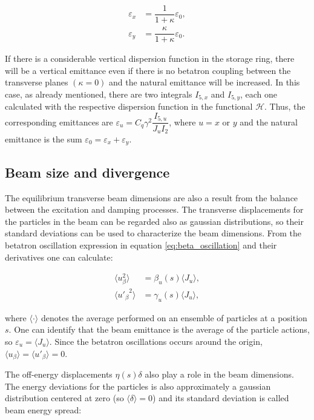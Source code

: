 \begin{align}
    \varepsilon_x &= \dfrac{1}{1 + \kappa}\varepsilon_0, \\
    \varepsilon_y &= \dfrac{\kappa}{1 + \kappa}\varepsilon_0.
\end{align}

If there is a considerable vertical dispersion function in the storage ring, there will be a vertical emittance even if there is no betatron coupling between the transverse planes $(\kappa = 0)$ and the natural emittance will be increased. In this case, as already mentioned, there are two integrals $I_{5, x}$ and $I_{5, y}$, each one calculated with the respective dispersion function in the functional $\mathcal{H}$. Thus, the corresponding emittances are $\varepsilon_u = C_q \gamma^2 \dfrac{I_{5, u}}{J_u I_2}$, where $u=x$ or $y$ and the natural emittance is the sum $\varepsilon_0 = \varepsilon_x + \varepsilon_y$.

\subsection{Beam size and divergence}

The equilibrium transverse beam dimensions are also a result from the balance between the excitation and damping processes. The transverse displacements for the particles in the beam can be regarded also as gaussian distributions, so their standard deviations can be used to characterize the beam dimensions. From the betatron oscillation expression in equation \eqref{eq:beta_oscillation} and their derivatives one can calculate:

\begin{align}
    \langle u_{\beta}^2 \rangle &= \beta_u(s) \langle J_u \rangle,  \\
    \langle {u'_{\beta}}^{2} \rangle &= \gamma_u(s) \langle J_u \rangle,
\end{align}

where $\langle \cdot \rangle$ denotes the average performed on an ensemble of particles at a position $s$. One can identify that the beam emittance is the average of the particle actions, so $\varepsilon_u = \langle J_u \rangle$. Since the betatron oscillations occurs around the origin, $\langle u_{\beta}\rangle = \langle u'_{\beta}\rangle = 0$. 

The off-energy displacements $\eta(s)\delta$ also play a role in the beam dimensions. The energy deviations for the particles is also approximately a gaussian distribution centered at zero (so $\langle \delta \rangle = 0$) and its standard deviation is called beam energy spread:


